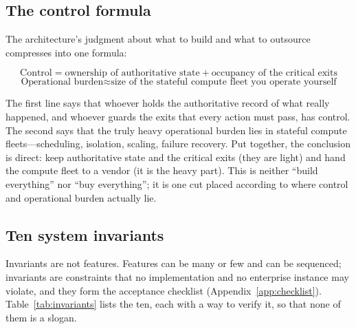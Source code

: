 \subsection{The control formula}

The architecture's judgment about what to build and what to outsource compresses into one formula:

\[
  \text{Control} = \text{ownership of authoritative state} + \text{occupancy of the critical exits}
\]
\[
  \text{Operational burden} \approx \text{size of the stateful compute fleet you operate yourself}
\]

The first line says that whoever holds the authoritative record of what really happened, and whoever guards the exits that every action must pass, has control. The second says that the truly heavy operational burden lies in stateful compute fleets---scheduling, isolation, scaling, failure recovery. Put together, the conclusion is direct: keep authoritative state and the critical exits (they are light) and hand the compute fleet to a vendor (it is the heavy part). This is neither ``build everything'' nor ``buy everything''; it is one cut placed according to where control and operational burden actually lie.

\subsection{Ten system invariants}

Invariants are not features. Features can be many or few and can be sequenced; invariants are constraints that no implementation and no enterprise instance may violate, and they form the acceptance checklist (Appendix~\ref{app:checklist}). Table~\ref{tab:invariants} lists the ten, each with a way to verify it, so that none of them is a slogan.

